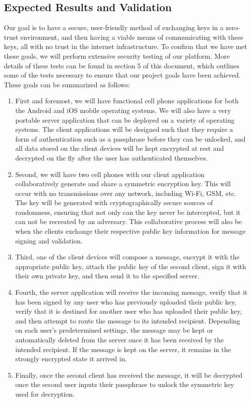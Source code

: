 \documentclass[11pt]{article}
\begin{document}
\subsection{Expected Results and Validation}
Our goal is to have a secure, user-friendly method of exchanging keys in a zero-trust environment, and then having a viable means of communicating with these keys, all with no trust in the internet infrastructure. To confirm that we have met these goals, we will perform extensive security testing of our platform. More details of these tests can be found in section 5 of this document, which outlines some of the tests necessary to ensure that our project goals have been achieved. These goals can be summarized as follows:
\begin{enumerate}
	\item{First and foremost, we will have functional cell phone applications for both the Android and iOS mobile operating systems. We will also have a very portable server application that can be deployed on a variety of operating systems. The client applications will be designed such that they require a form of authentication such as a passphrase before they can be unlocked, and all data stored on the client devices will be kept encrypted at rest and decrypted on the fly after the user has authenticated themselves.}
	\item{Second, we will have two cell phones with our client application collaboratively generate and share a symmetric encryption key. This will occur with no transmissions over any network, including Wi-Fi, GSM, etc. The key will be generated with cryptographically secure sources of randomness, ensuring that not only can the key never be intercepted, but it can not be recreated by an adversary. This collaborative process will also be when the clients exchange their respective public key information for message signing and validation.}
	\item{Third, one of the client devices will compose a message, encrypt it with the appropriate public key, attach the public key of the second client, sign it with their own private key, and then send it to the specified server.}
	\item{Fourth, the server application will receive the incoming message, verify that it has been signed by any user who has previously uploaded their public key, verify that it is destined for another user who has uploaded their public key, and then attempt to route the message to its intended recipient. Depending on each user’s predetermined settings, the message may be kept or automatically deleted from the server once it has been received by the intended recipient. If the message is kept on the server, it remains in the strongly encrypted state it arrived in.}
	\item{Finally, once the second client has received the message, it will be decrypted once the second user inputs their passphrase to unlock the symmetric key used for decryption.}
\end{enumerate}
\end{document}
